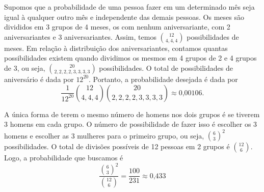 \begin{questions}
\begin{solution}
\end{solution}

\setcounter{question}{47}
\begin{solution}
Supomos que a probabilidade de uma pessoa fazer em um determinado mês seja igual à qualquer outro mês e independente das demais pessoas. Os meses são divididos em 3 grupos de 4 meses, os com nenhum aniversariante, com 2 aniversariantes e 3 aniversariantes. Assim, temos $\binom{12}{4,4,4}$ possibilidades de meses. Em relação à distribuição dos aniversariantes, contamos quantas possibilidades existem quando dividimos os mesmos em 4 grupos de 2 e 4 grupos de 3, ou seja, $\binom{20}{2,2,2,2,3,3,3,3}$ possibilidades. O total de possibilidades de aniversário é dada por $12^{20}$. Portanto, a probabilidade desejada é dada por
	\[\dfrac{1}{12^{20}}\binom{12}{4,4,4}\binom{20}{2,2,2,2,3,3,3,3} \approx\text{0,00106}.\]
\end{solution}

\begin{solution}
A única forma de terem o mesmo número de homens nos dois grupos é se tiverem 3 homens em cada grupo. O número de possibilidade de fazer isso é escolher os 3 homens e escolher as 3 mulheres para o primeiro grupo, ou seja, $\binom{6}{3}^2$ possibilidades. O total de divisões possíveis de 12 pessoas em 2 grupos é $\binom{12}{6}$. Logo, a probabilidade que buscamos é
	\[\dfrac{\binom{6}{3}^2}{\binom{12}{6}}
    	= \dfrac{100}{231} \approx \text{0,433}\]
\end{solution}


\end{questions}
